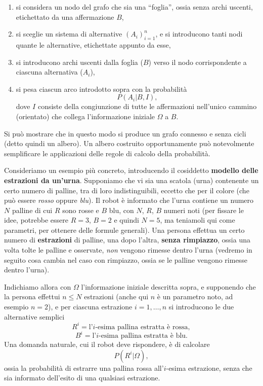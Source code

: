 \documentclass[
  italian,
  letterpaper,
]{book}
\providecommand{\tightlist}{%
  \setlength{\itemsep}{0pt}\setlength{\parskip}{0pt}}
\theoremstyle{definition}
\theoremstyle{remark}
\begin{document}
\begin{enumerate}
\def\labelenumi{\arabic{enumi}.}
\tightlist
\item
  si considera un nodo del grafo che sia una ``foglia'', ossia senza
  archi uscenti, etichettato da una affermazione \(B\),
\item
  si sceglie un sistema di alternative \((A_i)_{i=1}^n\), e si
  introducono tanti nodi quante le alternative, etichettate appunto da
  esse,
\item
  si introducono archi uscenti dalla foglia (\(B\)) verso il nodo
  corrispondente a ciascuna alternativa (\(A_i\)),
\item
  si pesa ciascun arco introdotto sopra con la probabilità
  \[P(A_i| B, I),\] dove \(I\) consiste della congiunzione di tutte le
  affermazioni nell'unico cammino (orientato) che collega l'informazione
  iniziale \(\Omega\) a \(B\).
\end{enumerate}

Si può mostrare che in questo modo si produce un grafo connesso e senza
cicli (detto quindi un albero). Un albero costruito opportunamente può
notevolmente semplificare le applicazioni delle regole di calcolo della
probabilità.

Consideriamo un esempio più concreto, introducendo il cosiddetto
\textbf{modello delle estrazioni da un'urna}. Supponiamo che vi sia una
scatola (urna) contenente un certo numero di palline, tra di loro
indistinguibili, eccetto che per il colore (che può essere \emph{rosso}
oppure \emph{blu}). Il robot è informato che l'urna contiene un numero
\(N\) palline di cui \(R\) sono rosse e \(B\) blu, con \(N\), \(R\),
\(B\) numeri noti (per fissare le idee, potrebbe essere \(R=3\), \(B=2\)
e quindi \(N=5\), ma teniamoli qui come parametri, per ottenere delle
formule generali). Una persona effettua un certo numero di
\textbf{estrazioni} di palline, una dopo l'altra, \textbf{senza
rimpiazzo}, ossia una volta tolte le palline e osservate, \emph{non}
vengono rimesse dentro l'urna (vedremo in seguito cosa cambia nel caso
con rimpiazzo, ossia se le palline vengono rimesse dentro l'urna).

Indichiamo allora con \(\Omega\) l'informazione iniziale descritta
sopra, e supponendo che la persona effettui \(n \le N\) estrazioni
(anche qui \(n\) è un parametro noto, ad esempio \(n=2\)), e per
ciascuna estrazione \(i =1, \ldots, n\) si introducono le due
alternative semplici
\[ R^i = \text{l'$i$-esima pallina estratta è rossa},\]
\[ B^i = \text{l'$i$-esima pallina estratta è blu}.\] Una domanda
naturale, cui il robot deve rispondere, è di calcolare
\[P(R^i | \Omega),\] ossia la probabilità di estrarre una pallina rossa
all'\(i\)-esima estrazione, senza che sia informato dell'esito di una
qualsiasi estrazione.
\end{document}
